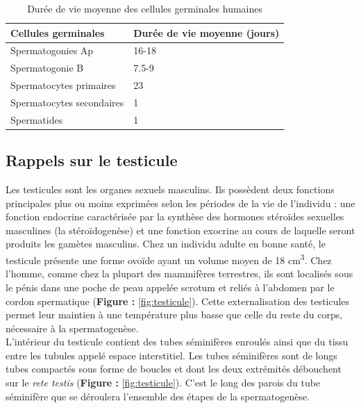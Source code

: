 \documentclass[12pt,twoside]{reedthesis}
\theoremstyle{definition}
\theoremstyle{definition}
\theoremstyle{remark}
\begin{document}
  \begin{longtable}[t]{ll}
  \caption{\label{tab:spermatotime}Durée de vie moyenne des cellules germinales humaines}\\
  \toprule
  Cellules germinales & Durée de vie moyenne (jours)\\
  \midrule
  Spermatogonies Ap & 16-18\\
  Spermatogonie B & 7.5-9\\
  Spermatocytes primaires & 23\\
  Spermatocytes secondaires & 1\\
  Spermatides & 1\\
  \bottomrule
  \end{longtable}
  
  \newpage
  
  \subsection{Rappels sur le testicule}\label{rappels-sur-le-testicule}
  
  Les testicules sont les organes sexuels masculins. Ils possèdent deux
  fonctions principales plus ou moins exprimées selon les périodes de la
  vie de l'individu : une fonction endocrine caractérisée par la synthèse
  des hormones stéroïdes sexuelles masculines (la stéroïdogenèse) et une
  fonction exocrine au cours de laquelle seront produits les gamètes
  masculins. Chez un individu adulte en bonne santé, le testicule présente
  une forme ovoïde ayant un volume moyen de 18 cm\textsuperscript{3}. Chez
  l'homme, comme chez la plupart des mammifères terrestres, ils sont
  localisés sous le pénis dans une poche de peau appelée scrotum et reliés
  à l'abdomen par le cordon spermatique (\textbf{Figure :}
  \ref{fig:testicule}). Cette externalisation des testicules permet leur
  maintien à une température plus basse que celle du reste du corps,
  nécessaire à la spermatogenèse.\\
  L'intérieur du testicule contient des tubes séminifères enroulés ainsi
  que du tissu entre les tubules appelé espace interstitiel. Les tubes
  séminifères sont de longs tubes compactés sous forme de boucles et dont
  les deux extrémités débouchent sur le \emph{rete testis} (\textbf{Figure
  :} \ref{fig:testicule}). C'est le long des parois du tube séminifère que
  se déroulera l'ensemble des étapes de la spermatogenèse.
  
\end{document}
